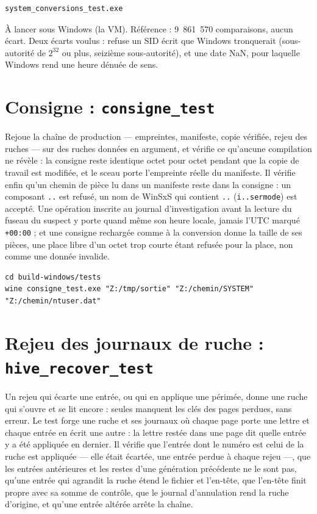 \documentclass[11pt,a4paper,oneside]{report}
\begin{document}
\begin{lstlisting}
system_conversions_test.exe
\end{lstlisting}

À lancer sous Windows (la VM). Référence : 9~861~570 comparaisons, aucun écart.
Deux écarts voulus : \wac{} refuse un SID écrit que Windows tronquerait
(sous-autorité de $2^{32}$ ou plus, seizième sous-autorité), et une date NaN,
pour laquelle Windows rend une heure dénuée de sens.

\section{Consigne : \texttt{consigne\_test}}

Rejoue la chaîne de production — empreintes, manifeste, copie vérifiée, rejeu
des ruches — sur des ruches données en argument, et vérifie ce qu'aucune
compilation ne révèle : la consigne reste identique octet pour octet pendant que
la copie de travail est modifiée, et le sceau porte l'empreinte réelle du
manifeste. Il vérifie enfin qu'un chemin de pièce lu dans un manifeste reste
dans la consigne : un composant \texttt{..} est refusé, un nom de WinSxS qui
contient \texttt{..} (\texttt{i..sermode}) est accepté. Une opération inscrite au
journal d'investigation avant la lecture du fuseau du suspect y porte quand
même son heure locale, jamais l'UTC marqué \texttt{+00:00} ; et une consigne
rechargée comme à la conversion donne la taille de ses pièces, une place
libre d'un octet trop courte étant refusée pour la place, non comme une
donnée invalide.

\begin{lstlisting}
cd build-windows/tests
wine consigne_test.exe "Z:/tmp/sortie" "Z:/chemin/SYSTEM" "Z:/chemin/ntuser.dat"
\end{lstlisting}

\section{Rejeu des journaux de ruche : \texttt{hive\_recover\_test}}

Un rejeu qui écarte une entrée, ou qui en applique une périmée, donne une ruche
qui s'ouvre et se lit encore : seules manquent les clés des pages perdues, sans
erreur. Le test forge une ruche et ses journaux où chaque page porte une lettre
et chaque entrée en écrit une autre : la lettre restée dans une page dit quelle
entrée y a été appliquée en dernier. Il vérifie que l'entrée dont le numéro est
celui de la ruche est appliquée — elle était écartée, une entrée perdue à
chaque rejeu —, que les entrées antérieures et les restes d'une génération
précédente ne le sont pas, qu'une entrée qui agrandit la ruche étend le fichier
et l'en-tête, que l'en-tête finit propre avec sa somme de contrôle, que le
journal d'annulation rend la ruche d'origine, et qu'une entrée altérée arrête la
chaîne.
\end{document}
